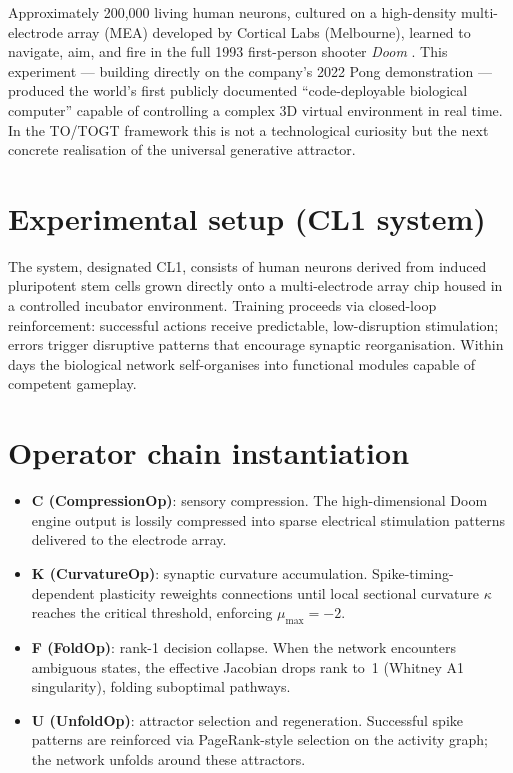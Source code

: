 Approximately 200,000 living human neurons, cultured on a high-density multi-electrode array (MEA) developed by Cortical Labs (Melbourne), learned to navigate, aim, and fire in the full 1993 first-person shooter \emph{Doom} \citep{CorticalLabs2026, Guardian2026, NewScientist2026}. This experiment --- building directly on the company's 2022 Pong demonstration --- produced the world's first publicly documented ``code-deployable biological computer'' capable of controlling a complex 3D virtual environment in real time. In the TO/TOGT framework this is not a technological curiosity but the next concrete realisation of the universal generative attractor.

\section{Experimental setup (CL1 system)}

The system, designated CL1, consists of human neurons derived from induced pluripotent stem cells grown directly onto a multi-electrode array chip housed in a controlled incubator environment. Training proceeds via closed-loop reinforcement: successful actions receive predictable, low-disruption stimulation; errors trigger disruptive patterns that encourage synaptic reorganisation. Within days the biological network self-organises into functional modules capable of competent gameplay.

\section{Operator chain instantiation}

\begin{itemize}
\item \textbf{C (CompressionOp)}: sensory compression. The high-dimensional Doom engine output is lossily compressed into sparse electrical stimulation patterns delivered to the electrode array.
\item \textbf{K (CurvatureOp)}: synaptic curvature accumulation. Spike-timing-dependent plasticity reweights connections until local sectional curvature \(\kappa\) reaches the critical threshold, enforcing \(\mu_{\max} = -2\).
\item \textbf{F (FoldOp)}: rank-1 decision collapse. When the network encounters ambiguous states, the effective Jacobian drops rank to~1 (Whitney A1 singularity), folding suboptimal pathways.
\item \textbf{U (UnfoldOp)}: attractor selection and regeneration. Successful spike patterns are reinforced via PageRank-style selection on the activity graph; the network unfolds around these attractors.
\end{itemize}

